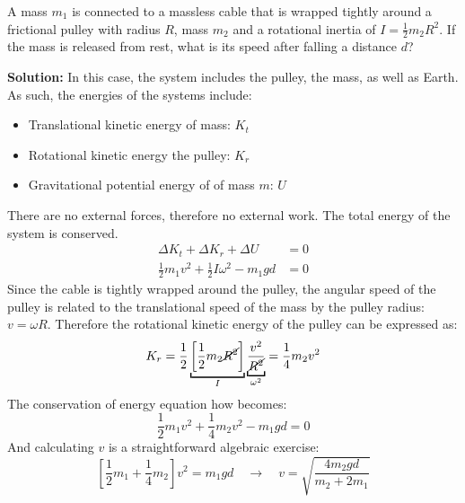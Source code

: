 \begin{example}
  A mass $m_1$ is connected to a massless cable that is wrapped tightly around
  a frictional pulley with radius $R$, mass $m_2$ and a rotational inertia of
  $I=\frac12m_2R^2$. If the mass is released from rest, what is its speed after
  falling a distance $d$?
  \begin{center}
  \end{center}
  \textbf{Solution:} In this case, the system includes the pulley, the mass, as
  well as Earth. As such, the energies of the systems include:
  \begin{itemize}
  \item Translational kinetic energy of mass: $K_t$
  \item Rotational kinetic energy the pulley: $K_r$
  \item Gravitational potential energy of of mass $m$: $U$
  \end{itemize}
  There are no external forces, therefore no external work. The total energy
  of the system is conserved.
  \begin{align*}
    \Delta K_t + \Delta K_r + \Delta U  &= 0\\
    \frac12m_1v^2 +\frac12I\omega^2-m_1gd & = 0
  \end{align*}
  Since the cable is tightly wrapped around the pulley, the angular speed of
  the pulley is related to the translational speed of the mass by the pulley
  radius: $v=\omega R$. Therefore the rotational kinetic energy of the
  pulley can be expressed as:
  \begin{equation*}
    K_r=\frac12
    \underbracket[1pt]{\left[\frac12m_2\cancel{R^2}\right]}_I
    \underbracket[1pt]{\frac{v^2}{\cancel{R^2}}}_{\omega^2}
        =\frac14m_2v^2
  \end{equation*}
  The conservation of energy equation how becomes:
  \begin{equation*}
    \frac12m_1v^2 +\frac14m_2v^2-m_1gd = 0
  \end{equation*}
  And calculating $v$ is a straightforward algebraic exercise:
  \begin{equation*}
    \left[\frac12m_1+\frac14m_2\right]v^2 =m_1gd\quad\rightarrow\quad
    \boxed{
      v=\sqrt{\frac{4m_2gd}{m_2+2m_1}}
    }
  \end{equation*}
\end{example}



